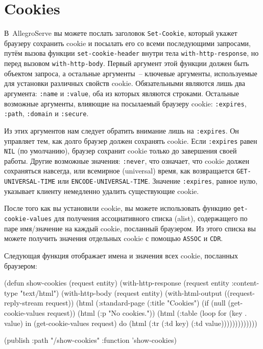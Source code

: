 \section{Cookies}

В~AllegroServe вы можете послать заголовок \lstinline{Set-Cookie}, который укажет браузеру
сохранить cookie и посылать его со всеми последующими запросами, путём вызова функции
\lstinline{set-cookie-header} внутри тела \lstinline{with-http-response}, но перед вызовом
\lstinline{with-http-body}. Первый аргумент этой функции должен быть объектом запроса, а
остальные аргументы~-- ключевые аргументы, используемые для установки различных свойств
cookie. Обязательными являются лишь два аргумента: \lstinline{:name} и \lstinline{:value}, оба из
которых являются строками. Остальные возможные аргументы, влияющие на посылаемый браузеру
cookie: \lstinline{:expires}, \lstinline{:path}, \lstinline{:domain} и \lstinline{:secure}.

Из этих аргументов нам следует обратить внимание лишь на \lstinline{:expires}. Он управляет
тем, как долго браузер должен сохранять cookie. Если \lstinline{:expires} равен \lstinline{NIL}
(по умолчанию), браузер сохранит cookie только до завершения своей работы. Другие
возможные значения: \lstinline{:never}, что означает, что cookie должен сохраняться навсегда,
или всемирное (universal) время, как возвращается \lstinline{GET-UNIVERSAL-TIME} или
\lstinline{ENCODE-UNIVERSAL-TIME}. Значение \lstinline{:expires}, равное нулю, указывает клиенту
немедленно удалить существующие cookie.

После того как вы установили cookie, вы можете использовать функцию
\lstinline{get-cookie-values} для получения ассоциативного списка (alist), содержащего по паре
имя/значение на каждый cookie, посланный браузером. Из этого списка вы можете получить
значения отдельных cookie с помощью \lstinline{ASSOC} и \lstinline{CDR}.

Следующая функция отображает имена и значения всех cookie, посланных браузером:

\begin{myverb}
(defun show-cookies (request entity)
  (with-http-response (request entity :content-type "text/html")
    (with-http-body (request entity)
      (with-html-output ((request-reply-stream request))
        (html
          (:standard-page
           (:title "Cookies")
           (if (null (get-cookie-values request))
             (html (:p "No cookies."))
             (html 
               (:table
                 (loop for (key . value) in (get-cookie-values request)
                    do (html (:tr (:td key) (:td value)))))))))))))

(publish :path "/show-cookies" :function 'show-cookies)
\end{myverb}

